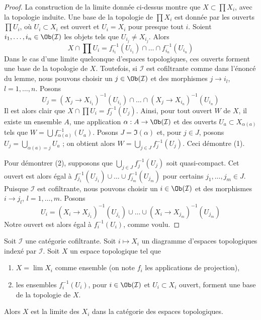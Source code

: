 \begin{proof}
La construction de la limite donnée ci-dessus montre que
$X \subset \prod X_i$, avec la topologie induite. Une base de la topologie de
$\prod X_i$ est donnée par les ouverts $\prod U_i$, où $U_i \subset X_i$ est
ouvert et $U_i = X_i$ pour presque tout $i$. Soient
$i_1, \ldots, i_n \in \Ob(\mathcal{I})$ les objets tels que
$U_{i_j} \not = X_{i_j}$. Alors
$$
X \cap \prod U_i = f_{i_1}^{-1}(U_{i_1}) \cap \ldots \cap f_{i_n}^{-1}(U_{i_n})
$$
Dans le cas d'une limite quelconque d'espaces topologiques, ces ouverts
forment une base de la topologie de $X$. Toutefois, si $\mathcal{I}$ est
cofiltrante comme dans l'énoncé du lemme, nous pouvons choisir un
$j \in \Ob(\mathcal{I})$ et des morphismes $j \to i_l$,
$l = 1, \ldots, n$. Posons
$$
U_j =
(X_j \to X_{i_1})^{-1}(U_{i_1}) \cap \ldots \cap
(X_j \to X_{i_n})^{-1}(U_{i_n})
$$
Il est alors clair que $X \cap \prod U_i = f_j^{-1}(U_j)$. Ainsi, pour tout
ouvert $W$ de $X$, il existe un ensemble $A$, une application
$\alpha : A \to \Ob(\mathcal{I})$ et des ouverts
$U_a \subset X_{\alpha(a)}$ tels que
$W = \bigcup f_{\alpha(a)}^{-1}(U_a)$. Posons $J = \Im(\alpha)$ et, pour
$j \in J$, posons $U_j = \bigcup_{\alpha(a) = j} U_a$ ; on obtient alors
$W = \bigcup_{j \in J} f_j^{-1}(U_j)$.
Ceci démontre (1).

\medskip\noindent
Pour démontrer (2), supposons que
$\bigcup_{j \in J} f_j^{-1}(U_j)$ soit quasi-compact. Cet ouvert est alors
égal à $f_{j_1}^{-1}(U_{j_1}) \cup \ldots \cup f_{j_m}^{-1}(U_{j_m})$
pour certains $j_1, \ldots, j_m \in J$. Puisque $\mathcal{I}$ est
cofiltrante, nous pouvons choisir un $i \in \Ob(\mathcal{I})$ et des
morphismes $i \to j_l$, $l = 1, \ldots, m$. Posons
$$
U_i =
(X_i \to X_{j_1})^{-1}(U_{j_1}) \cup \ldots \cup
(X_i \to X_{j_m})^{-1}(U_{j_m})
$$
Notre ouvert est alors égal à $f_i^{-1}(U_i)$, comme voulu.
\end{proof}

\begin{lemma}
\label{lemma-characterize-limit}
Soit $\mathcal{I}$ une catégorie cofiltrante. Soit $i \mapsto X_i$ un
diagramme d'espaces topologiques indexé par $\mathcal{I}$. Soit $X$ un espace
topologique tel que
\begin{enumerate}
\item $X = \lim X_i$ comme ensemble (on note $f_i$ les applications de
projection),
\item les ensembles $f_i^{-1}(U_i)$, pour $i \in \Ob(\mathcal{I})$ et
$U_i \subset X_i$ ouvert, forment une base de la topologie de $X$.
\end{enumerate}
Alors $X$ est la limite des $X_i$ dans la catégorie des espaces topologiques.
\end{lemma}

